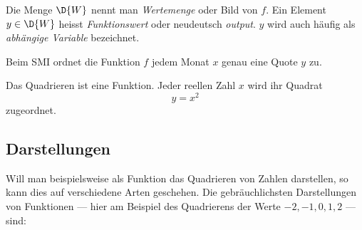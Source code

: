 \documentclass[%
11pt,%
twoside,%
titlepage,%
german,%
headsepline%
]{scrartcl}
\begin{document}
\begin{cdef}{}
Die Menge $\D{W}$ nennt man \emph{Wertemenge} oder Bild von $f$.  Ein Element $y\in\D{W}$ heisst \emph{Funktionswert} oder neudeutsch \emph{output}. $y$ wird auch h\"aufig als \emph{abh\"angige Variable} bezeichnet.
\end{cdef}
\begin{bsp}
Beim SMI ordnet die Funktion $f$ jedem Monat $x$ genau eine Quote $y$ zu.
\end{bsp}
\begin{bsp}
Das Quadrieren ist eine Funktion. Jeder reellen Zahl $x$ wird ihr Quadrat
$$y=x^2$$
zugeordnet.
\end{bsp}
\subsection{Darstellungen}
Will man beispielsweise als Funktion das Quadrieren von Zahlen darstellen, so kann dies auf verschiedene Arten geschehen. Die gebr\"auchlichsten Darstellungen von Funktionen --- hier am Beispiel des Quadrierens der Werte $-2,-1,0,1,2$ --- sind:
\end{document}
